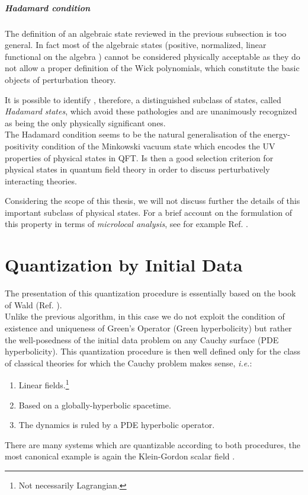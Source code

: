\documentclass[Main]{subfiles}
\begin{document}
				\subparagraph{Hadamard condition}
					 The definition of an algebraic state reviewed in the previous subsection is too general.
					 In fact most of the algebraic states
					 \ifToninus (positive, normalized, linear functional on the algebra )\fi
					 cannot be considered physically acceptable as they do not allow a proper definition of the Wick polynomials, which constitute the basic objects of perturbation theory.

					 It is possible to identify , therefore, a distinguished subclass of states, called \emph{Hadamard states}, which avoid these pathologies and are unanimously recognized as being the only physically significant ones.\\
					 The Hadamard condition seems to be the natural generalisation of the energy-positivity condition of the Minkowski vacuum state which encodes the UV properties of physical states in QFT. Is then a good selection criterion for physical states in quantum field theory  in order  to discuss perturbatively interacting theories.

				Considering the scope of this thesis, we will not discuss further the details of this important subclass of physical states.
				For a brief account on the formulation of this property in terms of  \emph{microlocal analysis}, see for example Ref. \cite{Benini2013} \cite{Khavkine2014a}.




\section{Quantization by Initial Data}
	The presentation of this quantization procedure is essentially based on the book of Wald  (Ref. \cite{Wald1994}).\\
	Unlike the previous algorithm, in this case we do not exploit the condition of existence and uniqueness of Green's Operator (Green hyperbolicity) but rather the well-posedness of the initial data problem on any Cauchy surface (PDE hyperbolicity).
	This quantization procedure is then well defined  only for the class of classical theories for which the Cauchy problem %
	 makes sense,
	 \textit{i.e.}:
	\begin{enumerate}
		\item Linear fields.\footnote{Not necessarily Lagrangian.}
		\item Based on a globally-hyperbolic spacetime.
		\item The dynamics is ruled by a PDE hyperbolic operator.
	\end{enumerate}
	There are many systems  which are quantizable according to both procedures, the most canonical example is again the Klein-Gordon scalar field \cite{Wald1994}.
\end{document}
